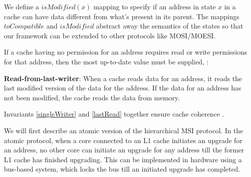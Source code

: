We define a $isModified(x)$ mapping to specify if an address in state $x$ in a
cache can have data different from what's present in its parent. The mappings
$toCompatible$ and $isModified$ abstract away the semantics of the states so
that our framework can be extended to other protocols like MOSI/MOESI.

If a cache having no permission for an address requires read or write
permissions for that address, then the most up-to-date value must be supplied,
\ie:

\begin{inv}
\textbf{Read-from-last-writer}: When a cache reads data for an address, it reads
the last modified version of the data for the address. If the data for an
address has not been modified, the cache reads the data from memory.
\label{lastRead}
\end{inv}

Invariants \ref{singleWriter} and \ref{lastRead} together ensure cache coherence
\cite{Patterson}.

We will first describe an atomic version of the hierarchical MSI protocol. In
the atomic protocol, when a core connected to an L1 cache initiates an upgrade
for an address, no other core can initiate an upgrade for any address till the
former L1 cache has finished upgrading. This can be implemented in hardware
using a bus-based system, which locks the bus till an initiated upgrade has
completed.


